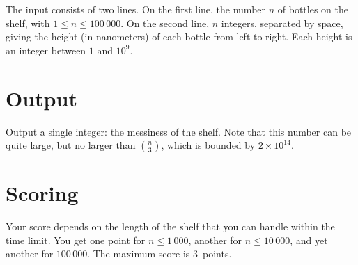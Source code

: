 The input consists of two lines.
On the first line, the number $n$ of bottles on the shelf, with $1\leq n\leq 100\,000$.
On the second line, $n$ integers, separated by space, giving the height (in nanometers) of each bottle from left to right.
Each height is an integer between $1$ and $10^9$.

\section*{Output}

Output a single integer: the messiness of the shelf.
Note that this number can be quite large, but no larger than $\binom{n}{3}$, which is bounded by $2 \times 10^{14}$.

\section*{Scoring}

Your score depends on the length of the shelf that you can handle within the time limit.
You get one point for $n\leq 1\,000$, another for $n\leq 10\,000$, and yet another for $100\,000$. 
The maximum score is $3$~points.

